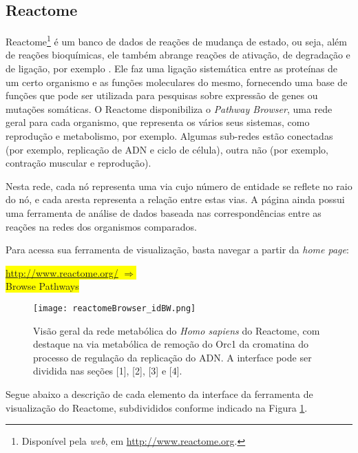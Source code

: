 
\subsection{Reactome}

\indent Reactome\footnote{Disponível pela \textit{web}, em \url{http://www.reactome.org}.} é um banco de dados de reações de mudança de estado, ou seja, além de reações bioquímicas, ele também abrange reações de ativação, de degradação e de ligação, por exemplo \cite{reactomeUsersguide}. Ele faz uma ligação sistemática entre as proteínas de um certo organismo e as funções moleculares do mesmo, fornecendo uma base de funções que pode ser utilizada para pesquisas sobre expressão de genes ou mutações somáticas. 
\indent O Reactome disponibiliza o \textit{Pathway Browser}, uma rede geral para cada organismo, que representa os vários seus sistemas, como reprodução e metabolismo, por exemplo. Algumas sub-redes estão conectadas (por exemplo, replicação de ADN e ciclo de célula), outra não (por exemplo, contração muscular e reprodução). 

\indent Nesta rede, cada nó representa uma via cujo número de entidade se reflete no raio do nó, e cada aresta representa a relação entre estas vias. A página ainda possui uma ferramenta de análise de dados baseada nas correspondências entre as reações na redes dos organismos comparados.

\indent Para acessa sua ferramenta de visualização, basta navegar a partir da \textit{home page}:

\indent \colorbox{yellow}{\url{http://www.reactome.org/} $\Rightarrow$} \\
\indent \colorbox{yellow}{Browse Pathways} \\

\begin{figure}[!h]
\centering
\texttt{[image: reactomeBrowser\_idBW.png]}
\caption{Visão geral da rede metabólica do \textit{Homo sapiens} do Reactome, com destaque na via metabólica de remoção do Orc1 da cromatina do processo de regulação da replicação do ADN. A interface pode ser dividida nas seções [1], [2], [3] e [4].}
\label{reactomeBrowser_id}
\end{figure}

\indent Segue abaixo a descrição de cada elemento da interface da ferramenta de visualização do Reactome, subdivididos  conforme indicado na Figura \ref{reactomeBrowser_id}.

